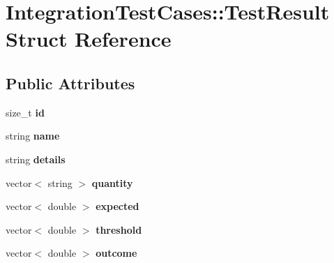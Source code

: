 \hypertarget{structIntegrationTestCases_1_1TestResult}{
\section{IntegrationTestCases::TestResult Struct Reference}
\label{structIntegrationTestCases_1_1TestResult}
}
\subsection*{Public Attributes}
\begin{DoxyCompactItemize}
\item 
\hypertarget{structIntegrationTestCases_1_1TestResult_a0817fba279f1b86ca7c5b429d451ef71}{
size\_\-t {\bfseries id}}
\label{structIntegrationTestCases_1_1TestResult_a0817fba279f1b86ca7c5b429d451ef71}

\item 
\hypertarget{structIntegrationTestCases_1_1TestResult_a7986697942e6019d018164970ccbd949}{
string {\bfseries name}}
\label{structIntegrationTestCases_1_1TestResult_a7986697942e6019d018164970ccbd949}

\item 
\hypertarget{structIntegrationTestCases_1_1TestResult_a28885188d08043008dcad7a67fbee6b7}{
string {\bfseries details}}
\label{structIntegrationTestCases_1_1TestResult_a28885188d08043008dcad7a67fbee6b7}

\item 
\hypertarget{structIntegrationTestCases_1_1TestResult_af2af6f48c7a0521ec6e9fe6063f3bdfd}{
vector$<$ string $>$ {\bfseries quantity}}
\label{structIntegrationTestCases_1_1TestResult_af2af6f48c7a0521ec6e9fe6063f3bdfd}

\item 
\hypertarget{structIntegrationTestCases_1_1TestResult_a2a5cfc8f2a05aede3c4f15a1f4232982}{
vector$<$ double $>$ {\bfseries expected}}
\label{structIntegrationTestCases_1_1TestResult_a2a5cfc8f2a05aede3c4f15a1f4232982}

\item 
\hypertarget{structIntegrationTestCases_1_1TestResult_ae11e5f3f6ab643596c7d687e5dd994a0}{
vector$<$ double $>$ {\bfseries threshold}}
\label{structIntegrationTestCases_1_1TestResult_ae11e5f3f6ab643596c7d687e5dd994a0}

\item 
\hypertarget{structIntegrationTestCases_1_1TestResult_a70c7b5a3d62df6006d8046ed12129dd8}{
vector$<$ double $>$ {\bfseries outcome}}
\label{structIntegrationTestCases_1_1TestResult_a70c7b5a3d62df6006d8046ed12129dd8}


\end{DoxyCompactItemize}
